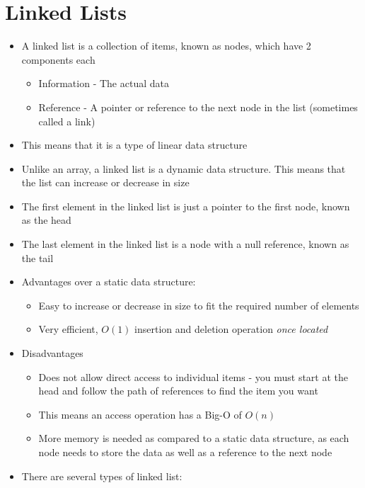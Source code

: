 
\section*{Linked Lists}

\begin{itemize}
  \item A linked list is a collection of items, known as nodes, which have 2 components each
  \begin{itemize}
    \item Information - The actual data
    \item Reference - A pointer or reference to the next node in the list (sometimes called a link)
  \end{itemize}
  \item This means that it is a type of linear data structure
  \item Unlike an array, a linked list is a dynamic data structure. This means that the list can increase or decrease in size
  \item The first element in the linked list is just a pointer to the first node, known as the head
  \item The last element in the linked list is a node with a null reference, known as the tail
  \item Advantages over a static data structure:
  \begin{itemize}
    \item Easy to increase or decrease in size to fit the required number of elements
    \item Very efficient, $O(1)$ insertion and deletion operation \emph{once located}
  \end{itemize}
  \item Disadvantages
  \begin{itemize}
    \item Does not allow direct access to individual items - you must start at the head and follow the path of references to find the item you want
    \item This means an access operation has a Big-O of $O(n)$
    \item More memory is needed as compared to a static data structure, as each node needs to store the data as well as a reference to the next node
  \end{itemize}
  \item There are several types of linked list:
  \begin{itemize}

\end{itemize}
\end{itemize}
